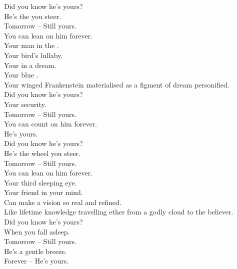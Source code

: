 
\label{album:butterfly-3000}




Did you know he's yours? \\
He's the  you steer. \\
Tomorrow -- Still yours. \\
You can lean on him forever. \\

Your man in the . \\
Your bird's lullaby. \\
Your  in a dream. \\
Your blue . \\
Your winged Frankenstein materialised as a figment of dream personified. \\

Did you know he's yours? \\
Your security. \\
Tomorrow -- Still yours. \\
You can count on him forever. \\
He's yours. \\

Did you know he's yours? \\
He's the wheel you steer. \\
Tomorrow -- Still yours. \\
You can lean on him forever. \\

Your third sleeping eye. \\
Your friend in your mind. \\
Can make a vision so real and refined. \\
Like lifetime knowledge travelling ether from a godly cloud to the believer. \\

Did you know he's yours? \\
When you fall asleep. \\
Tomorrow -- Still yours. \\
He's a gentle breeze. \\
Forever -- He's yours. \\

